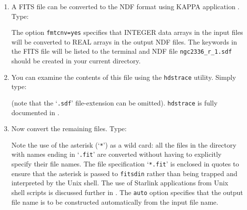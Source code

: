 \documentclass[twoside,11pt]{starlink}
\begin{document}
\begin{enumerate}
\begin{figure}[htbp]
  \end{figure}

  \item A FITS file can be converted to the NDF format using KAPPA
   application .  Type:

\begin{terminalv}
\end{terminalv}

   The option \texttt{fmtcnv=yes} specifies that INTEGER data arrays in the
   input files will be converted to REAL arrays in the output NDF files.
   The keywords in the FITS file will be listed to the terminal and NDF
   file \texttt{ngc2336\_r\_1.sdf} should be created in your current
   directory.

  \item You can examine the contents of this file using the \texttt{hdstrace}
   utility.  Simply type:

\begin{terminalv}
\end{terminalv}

   (note that the `\texttt{.sdf}' file-extension can be omitted).  \texttt{hdstrace} is fully documented in \/\cite{SUN102}.

  \item Now convert the remaining files.  Type:

\begin{terminalv}
\end{terminalv}

   Note the use of the asterisk (`\texttt{*}') as a wild card: all the files
   in the directory with names ending in `\texttt{.fit}' are converted without
   having to explicitly specify their file names.  The file specification
   `\texttt{*.fit}' is enclosed in quotes to ensure that the asterisk is
   passed to \texttt{fitsdin} rather than being trapped and interpreted by the
   Unix shell.  The use of Starlink applications from Unix shell scripts is
   discussed further in \cite{SC4}.  The \texttt{auto} option
   specifies that the output file name is to be constructed automatically
   from the input file name.

\end{enumerate}
\end{document}
